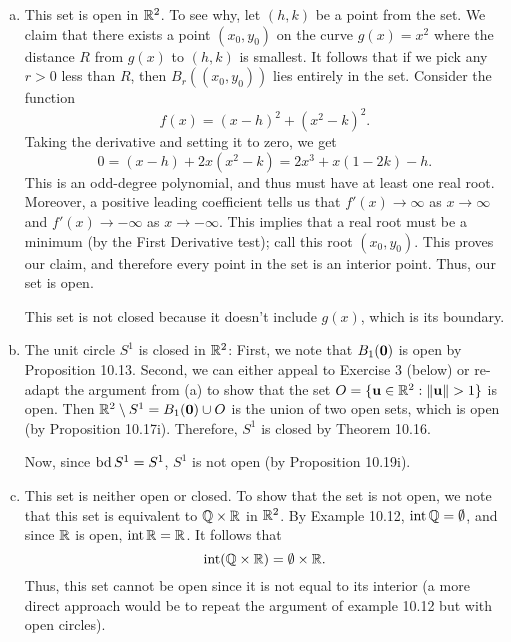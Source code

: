 \documentclass[letterpaper, twoside, 12pt]{book}
\begin{document}
\begin{solution}
  \begin{enumerate}[(a)]
    \item This set is open in \(\mathbb R^2\). To see why, let \((h, k)\) be a
          point from the set. We claim that there exists a point \((x_0, y_0)\)
          on the curve \(g(x) = x^2\) where the distance \(R\) from \(g(x)\) to 
          \((h,k)\) is smallest. It follows that if we pick any \(r > 0\) less
          than \(R\), then \(B_{r}((x_0, y_0))\) lies entirely in the set.
          Consider the function \[f(x) = (x - h)^2 + (x^2 - k)^2 .\] Taking the
          derivative and setting it to zero, we get
          \[ 0 = (x - h) + 2x(x^2 - k) = 2x^3 + x(1 - 2k) - h .\]
          This is an odd-degree polynomial, and thus must have at least one 
          real root. Moreover, a positive leading coefficient tells us
          that \(f'(x) \to \infty\) as \(x \to \infty\) and \(f'(x) \to -\infty\)
          as \(x \to -\infty\). This implies that a real root must be a 
          minimum (by the First Derivative test); call this root \((x_0, y_0)\).
          This proves our claim, and therefore every point in the set is 
          an interior point. Thus, our set is open.

          This set is not closed because it doesn't include \(g(x)\), which
          is its boundary.

    \item The unit circle \(S^1\) is closed in \(\mathbb R^2\): First, we note
          that \(B_{1}(\mathbf 0)\) is open by Proposition 10.13. Second, 
          we can either appeal to Exercise 3 (below) or re-adapt the argument
          from (a) to show that the set 
          \(O = \{\mathbf u \in \mathbb R^2 : \|\mathbf u\| > 1 \}\) is open. Then
          \(\mathbb R^2 \setminus S^1 = B_{1}(\mathbf 0) \cup O\) is the union of
          two open sets, which is open (by Proposition 10.17i). Therefore,
          \(S^1\) is closed by Theorem 10.16.

          Now, since \(\operatorname{bd} S^1 = S^1\), \(S^1\) is not open
          (by Proposition 10.19i).

    \item This set is neither open or closed. To show that the
          set is not open, we note that this set is equivalent to
          \(\mathbb Q \times \mathbb R\) in \(\mathbb R^2\). By Example 10.12, 
          \(\operatorname{int} \mathbb Q = \emptyset\), and since \(\mathbb R\) is 
          open, \(\operatorname{int} \mathbb R = \mathbb R\). It follows that 
          \[\operatorname{int} (\mathbb Q \times \mathbb R) = \emptyset \times \mathbb R .\]
          Thus, this set cannot be open since it is not equal to its 
          interior (a more direct approach would be to repeat the 
          argument of example 10.12 but with open circles). 


\end{enumerate}
\end{solution}
\end{document}
